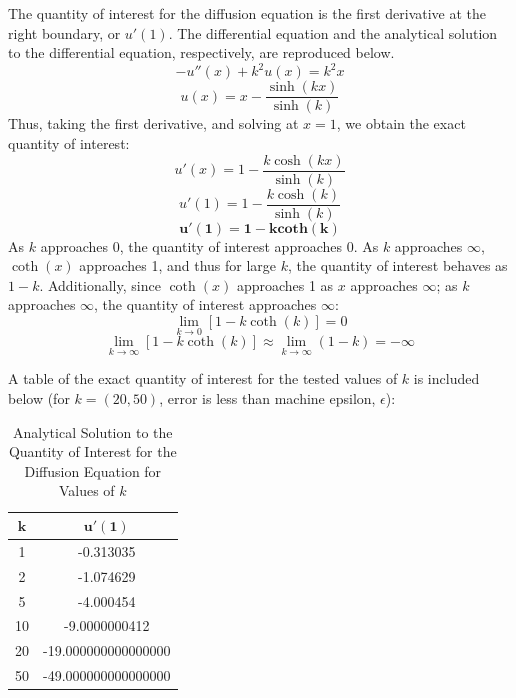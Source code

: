 \documentclass[10pt]{article}		%
\numberwithin{equation}{section}
\begin{document}
The quantity of interest for the diffusion equation is the first derivative at the right boundary, or $u'(1)$. The differential equation and the analytical solution to the differential equation, respectively, are reproduced below.
\begin{equation}
-u''(x)+k^2u(x)=k^2x
\end{equation}
\begin{equation}
u(x) = x - \frac{\sinh(kx)}{\sinh(k)}
\end{equation}
Thus, taking the first derivative, and solving at $x = 1$, we obtain the exact quantity of interest:
\begin{equation}
u'(x) = 1 - \frac{k\cosh(kx)}{\sinh(k)}
\end{equation}
\begin{equation}
u'(1) = 1 - \frac{k\cosh(k)}{\sinh(k)}
\end{equation}
\begin{equation}
\mathbf{u'(1) = 1 - kcoth(k)}
\end{equation}
As $k$ approaches 0, the quantity of interest approaches 0. As $k$ approaches $\infty$, $\coth(x)$ approaches 1, and thus for large $k$, the quantity of interest behaves as $1-k$. Additionally, since $\coth(x)$ approaches 1 as $x$ approaches $\infty$; as $k$ approaches $\infty$, the quantity of interest approaches $\infty$:
\begin{equation}
\lim_{k\to 0} [1 - k\coth(k)] = 0
\end{equation}
\begin{equation}
\lim_{k\to\infty} [1 - k\coth(k)] \approx \lim_{k\to\infty} (1-k) = -\infty
\end{equation}

A table of the exact quantity of interest for the tested values of $k$ is included below (for $k=(20, 50)$, error is less than machine epsilon, $\epsilon$):
\begin{table}[H]
	\caption{Analytical Solution to the Quantity of Interest for the Diffusion Equation for Values of $k$}
	\begin{tabular}{|c|c|}
		\hline 
		$\mathbf{k}$ & $\mathbf{u'(1)}$ \\ 
		\hline 
		1 & -0.313035 \\ 
		\hline 
		2 & -1.074629 \\ 
		\hline 
		5 & -4.000454 \\ 
		\hline 
		10 & -9.0000000412 \\ 
		\hline 
		20 & -19.000000000000000 \\ 
		\hline 
		50 & -49.000000000000000 \\ 
		\hline 
	\end{tabular}
\end{table} 
\end{document}
